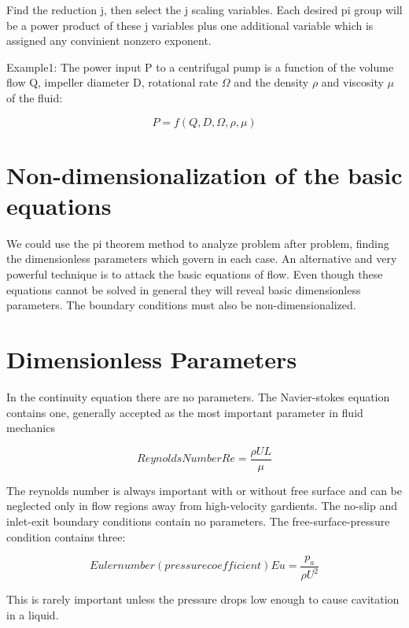 \documentclass{report}
\begin{document}
Find the reduction j, then select the j scaling variables. Each desired pi group will be a power product of these j variables plus one 
additional variable which is assigned any convinient nonzero exponent. 

Example1: The power input P to a centrifugal pump is a function of the volume flow Q, impeller diameter D, rotational rate \(\Omega\) and the density
\(\rho\) and viscosity \(\mu\) of the fluid:

\[P=f(Q,D,\Omega,\rho,\mu)\]

\section{Non-dimensionalization of the basic equations}
We could use the pi theorem method  to analyze problem after problem, finding the dimensionless parameters which govern in each case. An alternative and very powerful technique 
is to attack the basic equations of flow. Even though these equations cannot be solved in general they will reveal basic dimensionless parameters. The boundary conditions
must also be non-dimensionalized.
\section{Dimensionless Parameters}
In the continuity equation there are no parameters. The Navier-stokes equation contains one, generally accepted as the most important parameter in fluid mechanics

\[Reynolds Number Re = \frac{\rho UL}{\mu}\]

The reynolds number is always important with or without free surface and can be neglected only in flow regions away from high-velocity gardients.
The no-slip and inlet-exit boundary conditions contain no parameters. The free-surface-pressure condition contains three:

\[Euler number(pressure coefficient) Eu = \frac{p_a}{\rho U^2}\]

This is rarely important unless the pressure drops low enough to cause cavitation in a liquid.
\end{document}
